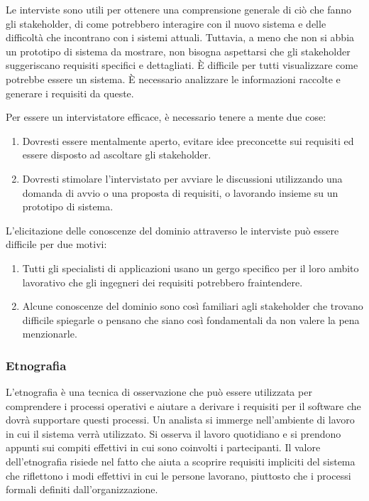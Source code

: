 Le interviste sono utili per ottenere una comprensione generale di ciò che fanno gli stakeholder, di come potrebbero interagire con il nuovo sistema e delle difficoltà che incontrano con i sistemi attuali. Tuttavia, a meno che non si abbia un prototipo di sistema da mostrare, non bisogna aspettarsi che gli stakeholder suggeriscano requisiti specifici e dettagliati. È difficile per tutti visualizzare come potrebbe essere un sistema. È necessario analizzare le informazioni raccolte e generare i requisiti da queste.

Per essere un intervistatore efficace, è necessario tenere a mente due cose:
\begin{enumerate}
    \item Dovresti essere mentalmente aperto, evitare idee preconcette sui requisiti ed essere disposto ad ascoltare gli stakeholder.
    \item Dovresti stimolare l'intervistato per avviare le discussioni utilizzando una domanda di avvio o una proposta di requisiti, o lavorando insieme su un prototipo di sistema.
\end{enumerate}
L'elicitazione delle conoscenze del dominio attraverso le interviste può essere difficile per due motivi:
\begin{enumerate}
    \item Tutti gli specialisti di applicazioni usano un gergo specifico per il loro ambito lavorativo che gli ingegneri dei requisiti potrebbero fraintendere.
    \item Alcune conoscenze del dominio sono così familiari agli stakeholder che trovano difficile spiegarle o pensano che siano così fondamentali da non valere la pena menzionarle.
\end{enumerate}

\subsubsection{Etnografia}
L'etnografia è una tecnica di osservazione che può essere utilizzata per comprendere i processi operativi e aiutare a derivare i requisiti per il software che dovrà supportare questi processi. Un analista si immerge nell'ambiente di lavoro in cui il sistema verrà utilizzato. Si osserva il lavoro quotidiano e si prendono appunti sui compiti effettivi in cui sono coinvolti i partecipanti. Il valore dell'etnografia risiede nel fatto che aiuta a scoprire requisiti impliciti del sistema che riflettono i modi effettivi in cui le persone lavorano, piuttosto che i processi formali definiti dall'organizzazione.

